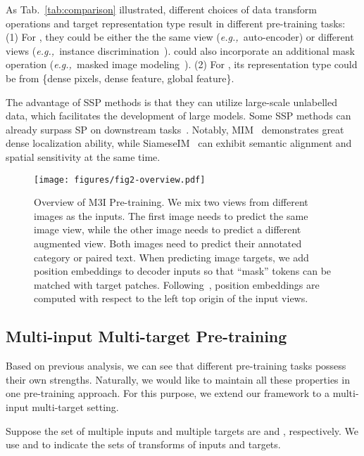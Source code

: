 \documentclass[10pt,twocolumn,letterpaper]{article}
\def\eg{\textit{e.g.,~}}
\def\name{M3I Pre-training}
\begin{document}
As Tab.~\ref{tab:comparison} illustrated, different choices of data transform operations  and target representation type  result in different pre-training tasks: (1) For , they could be either the the same view (\eg auto-encoder) or different views (\eg instance discrimination~\cite{chen2020simple,grill2020bootstrap,zbontar2021barlow}).  could also incorporate an additional mask operation (\eg masked image modeling~\cite{bao2021beit,he2022masked}). (2) For , its representation type could be from \{dense pixels, dense feature, global feature\}.

The advantage of SSP methods is that they can utilize large-scale unlabelled data, which facilitates the development of large models. Some SSP methods can already surpass SP on downstream tasks~\cite{he2020momentum,he2022masked,bao2021beit}. Notably, MIM~\cite{he2022masked,bao2021beit} demonstrates great dense localization ability, while SiameseIM~\cite{anonymous2022siamese} can exhibit semantic alignment and spatial sensitivity at the same time.

\begin{figure*}
    \centering
    \texttt{[image: figures/fig2-overview.pdf]}
    \vspace{-0.5em}
    \caption{Overview of \name{}. We mix two views from different images as the inputs. The first image needs to predict the same image view, while the other image needs to predict a different augmented view. Both images need to predict their annotated category or paired text. When predicting image targets, we add position embeddings to decoder inputs so that ``mask'' tokens can be matched with target patches. Following~\cite{anonymous2022siamese}, position embeddings are computed with respect to the left top origin of the input views.}
    \label{fig:my_label}
    \vspace{-1.0em}
\end{figure*}


\subsection{Multi-input Multi-target Pre-training}
Based on previous analysis, we can see that different pre-training tasks possess their own strengths. Naturally, we would like to maintain all these properties in one pre-training approach. 
For this purpose, we extend our framework to a multi-input multi-target setting.

Suppose the set of  multiple inputs and  multiple targets are  and , respectively. We use  and  to indicate the sets of transforms of inputs and targets. 
\end{document}
